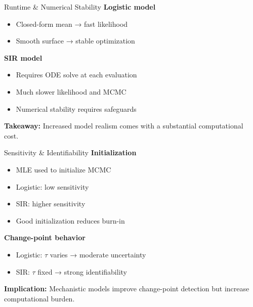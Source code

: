 \documentclass[
  ignorenonframetext,
  aspectratio=169,
]{beamer}
\providecommand{\tightlist}{%
  \setlength{\itemsep}{0pt}\setlength{\parskip}{0pt}}\usepackage{longtable,booktabs,array}
\begin{document}
\begin{frame}{Runtime \& Numerical Stability}
\label{runtime-numerical-stability}
\textbf{Logistic model}

\begin{itemize}
\tightlist
\item
  Closed-form mean → fast likelihood\\
\item
  Smooth surface → stable optimization
\end{itemize}

\textbf{SIR model}

\begin{itemize}
\tightlist
\item
  Requires ODE solve at each evaluation\\
\item
  Much slower likelihood and MCMC\\
\item
  Numerical stability requires safeguards
\end{itemize}

\textbf{Takeaway:} Increased model realism comes with a substantial
computational cost.
\end{frame}

\begin{frame}{Sensitivity \& Identifiability}
\label{sensitivity-identifiability}
\textbf{Initialization}

\begin{itemize}
\tightlist
\item
  MLE used to initialize MCMC\\
\item
  Logistic: low sensitivity\\
\item
  SIR: higher sensitivity\\
\item
  Good initialization reduces burn-in
\end{itemize}

\textbf{Change-point behavior}

\begin{itemize}
\tightlist
\item
  Logistic: \(\tau\) varies → moderate uncertainty\\
\item
  SIR: \(\tau\) fixed → strong identifiability
\end{itemize}

\textbf{Implication:} Mechanistic models improve change-point detection
but increase computational burden.
\end{frame}
\end{document}
